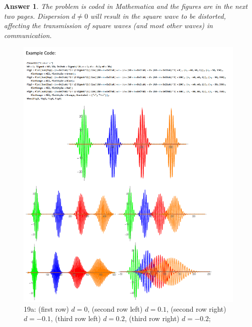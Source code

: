 \documentclass[a4paper]{article}
\newtheorem{ans}{Answer}[section]
\theoremstyle{new}
\begin{document}
\begin{ans}
The problem is coded in Mathematica and the figures are in the next two pages. Dispersion $d\neq 0$ will result in the square wave to be distorted, affecting the transmission of square waves (and most other waves) in communication.
\end{ans}
\begin{figure}[H]
    \centering
    \includegraphics[width=\linewidth]{19a.pdf}
    \caption{19a: (first row) $d=0$, (second row left) $d=0.1$, (second row right) $d=-0.1$, (third row left) $d=0.2$, (third row right) $d=-0.2$;}
\end{figure}
\end{document}
